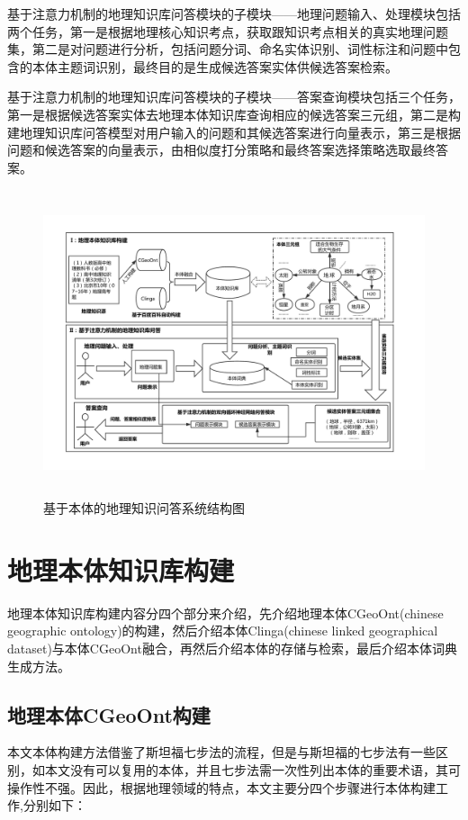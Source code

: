 基于注意力机制的地理知识库问答模块的子模块——地理问题输入、处理模块包括两个任务，第一是根据地理核心知识考点，获取跟知识考点相关的真实地理问题集，第二是对问题进行分析，包括问题分词、命名实体识别、词性标注和问题中包含的本体主题词识别，最终目的是生成候选答案实体供候选答案检索。

基于注意力机制的地理知识库问答模块的子模块——答案查询模块包括三个任务，第一是根据候选答案实体去地理本体知识库查询相应的候选答案三元组，第二是构建地理知识库问答模型对用户输入的问题和其候选答案进行向量表示，第三是根据问题和候选答案的向量表示，由相似度打分策略和最终答案选择策略选取最终答案。

\begin{figure}[!htb]
	\centering\includegraphics[height=9cm]{resource/graduation}
	\caption{基于本体的地理知识问答系统结构图}
	\label{fig:graduation}
\end{figure}

\section{地理本体知识库构建}
地理本体知识库构建内容分四个部分来介绍，先介绍地理本体CGeoOnt(chinese geographic ontology)的构建，然后介绍本体Clinga(chinese linked geographical dataset)与本体CGeoOnt融合，再然后介绍本体的存储与检索，最后介绍本体词典生成方法。

\subsection{地理本体CGeoOnt构建}\label{section:CGeoOnt_build}
本文本体构建方法借鉴了斯坦福七步法的流程，但是与斯坦福的七步法有一些区别，如本文没有可以复用的本体，并且七步法需一次性列出本体的重要术语，其可操作性不强。因此，根据地理领域的特点，本文主要分四个步骤进行本体构建工作,分别如下：

